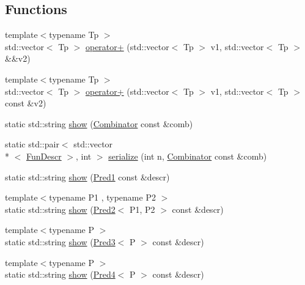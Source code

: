 \subsection*{Functions}
\begin{DoxyCompactItemize}
\item 
{\footnotesize template$<$typename Tp $>$ }\\std\-::vector$<$ Tp $>$ \hyperlink{namespacepfq__lang_1_1term_af3a95f621a668366d2ac1fb5f40a0387}{operator+} (std\-::vector$<$ Tp $>$ v1, std\-::vector$<$ Tp $>$ \&\&v2)
\item 
{\footnotesize template$<$typename Tp $>$ }\\std\-::vector$<$ Tp $>$ \hyperlink{namespacepfq__lang_1_1term_ada22d7ede3289952e9e56063fd2b2481}{operator+} (std\-::vector$<$ Tp $>$ v1, std\-::vector$<$ Tp $>$ const \&v2)
\item 
static std\-::string \hyperlink{namespacepfq__lang_1_1term_a1c6f67209bcea01f775438b2d7871b1f}{show} (\hyperlink{structpfq__lang_1_1term_1_1Combinator}{Combinator} const \&comb)
\item 
static std\-::pair$<$ std\-::vector\\*
$<$ \hyperlink{structpfq__lang_1_1FunDescr}{Fun\-Descr} $>$, int $>$ \hyperlink{namespacepfq__lang_1_1term_a56081fd4c7d006cb4c9936d191458640}{serialize} (int n, \hyperlink{structpfq__lang_1_1term_1_1Combinator}{Combinator} const \&comb)
\item 
static std\-::string \hyperlink{namespacepfq__lang_1_1term_a7b0962b23cd37fac436770d3fc48a301}{show} (\hyperlink{structpfq__lang_1_1term_1_1Pred1}{Pred1} const \&descr)
\item 
{\footnotesize template$<$typename P1 , typename P2 $>$ }\\static std\-::string \hyperlink{namespacepfq__lang_1_1term_a47537eae99f694ad7f88a1f854bd7d5e}{show} (\hyperlink{structpfq__lang_1_1term_1_1Pred2}{Pred2}$<$ P1, P2 $>$ const \&descr)
\item 
{\footnotesize template$<$typename P $>$ }\\static std\-::string \hyperlink{namespacepfq__lang_1_1term_a75e27db2005f2687c7c01a6695812260}{show} (\hyperlink{structpfq__lang_1_1term_1_1Pred3}{Pred3}$<$ P $>$ const \&descr)
\item 
{\footnotesize template$<$typename P $>$ }\\static std\-::string \hyperlink{namespacepfq__lang_1_1term_a94e2082634ed6fdb1543464bcb8dd1f3}{show} (\hyperlink{structpfq__lang_1_1term_1_1Pred4}{Pred4}$<$ P $>$ const \&descr)

\end{DoxyCompactItemize}
